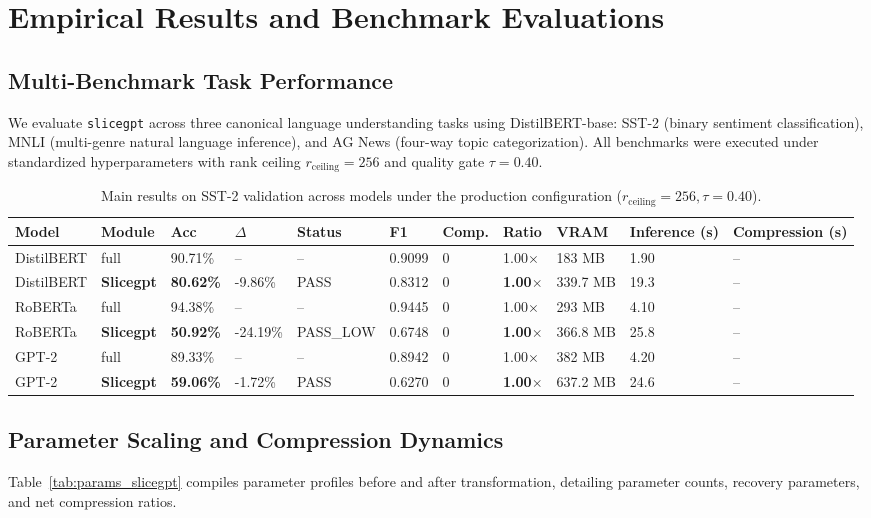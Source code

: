 \section{Empirical Results and Benchmark Evaluations}
\label{sec:results}

\subsection{Multi-Benchmark Task Performance}
We evaluate \texttt{slicegpt} across three canonical language understanding tasks using DistilBERT-base: SST-2 (binary sentiment classification), MNLI (multi-genre natural language inference), and AG News (four-way topic categorization). All benchmarks were executed under standardized hyperparameters with rank ceiling $r_{\mathrm{ceiling}} = 256$ and quality gate $\tau = 0.40$.

\begin{table}[t]
\centering
\small
\begin{tabular}{lllllllllll}
\toprule
\textbf{Model} & \textbf{Module} & \textbf{Acc} & \textbf{$\Delta$} & \textbf{Status} & \textbf{F1} & \textbf{Comp.} & \textbf{Ratio} & \textbf{VRAM} & \textbf{Inference (s)} & \textbf{Compression (s)} \\
\midrule
DistilBERT & full & 90.71\% & -- & -- & 0.9099 & 0 & 1.00$\times$ & 183 MB & 1.90 & -- \\
DistilBERT & \textbf{Slicegpt} & \textbf{80.62\%} & -9.86\% & PASS & 0.8312 & 0 & \textbf{1.00$\times$} & 339.7 MB & 19.3 & -- \\
RoBERTa & full & 94.38\% & -- & -- & 0.9445 & 0 & 1.00$\times$ & 293 MB & 4.10 & -- \\
RoBERTa & \textbf{Slicegpt} & \textbf{50.92\%} & -24.19\% & PASS_LOW & 0.6748 & 0 & \textbf{1.00$\times$} & 366.8 MB & 25.8 & -- \\
GPT-2 & full & 89.33\% & -- & -- & 0.8942 & 0 & 1.00$\times$ & 382 MB & 4.20 & -- \\
GPT-2 & \textbf{Slicegpt} & \textbf{59.06\%} & -1.72\% & PASS & 0.6270 & 0 & \textbf{1.00$\times$} & 637.2 MB & 24.6 & -- \\
\bottomrule
\end{tabular}
\caption{Main results on SST-2 validation across models under the production configuration ($r_{\mathrm{ceiling}}=256, \tau=0.40$).}
\label{tab:main_sst2}
\end{table}

\subsection{Parameter Scaling and Compression Dynamics}
Table~\ref{tab:params_slicegpt} compiles parameter profiles before and after transformation, detailing parameter counts, recovery parameters, and net compression ratios.

